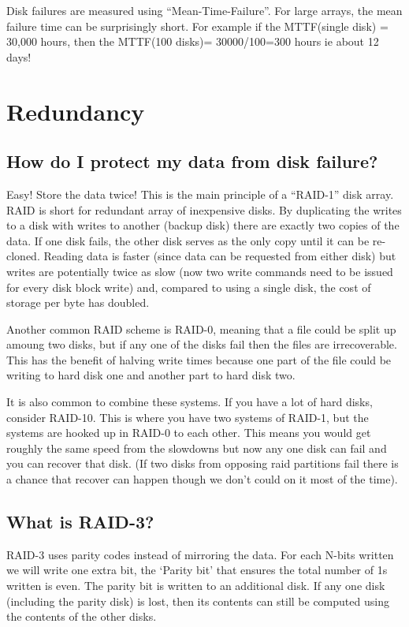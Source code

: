 Disk failures are measured using ``Mean-Time-Failure''. For large arrays, the mean failure time can be surprisingly short. For example if the MTTF(single disk) = 30,000 hours, then the MTTF(100 disks)= 30000/100=300 hours ie about 12 days!

\section{Redundancy}\label{redundancy}

\subsection{How do I protect my data from disk failure?}\label{how-do-i-protect-my-data-from-disk-failure}

Easy! Store the data twice! This is the main principle of a ``RAID-1'' disk array. RAID is short for redundant array of inexpensive disks. By duplicating the writes to a disk with writes to another (backup disk) there are exactly two copies of the data. If one disk fails, the other disk serves as the only copy until it can be re-cloned. Reading data is faster (since data can be requested from either disk) but writes are potentially twice as slow (now two write commands need to be issued for every disk block write) and, compared to using a single disk, the cost of storage per byte has doubled.

Another common RAID scheme is RAID-0, meaning that a file could be split up amoung two disks, but if any one of the disks fail then the files are irrecoverable. This has the benefit of halving write times because one part of the file could be writing to hard disk one and another part to hard disk two.

It is also common to combine these systems. If you have a lot of hard disks, consider RAID-10. This is where you have two systems of RAID-1, but the systems are hooked up in RAID-0 to each other. This means you would get roughly the same speed from the slowdowns but now any one disk can fail and you can recover that disk. (If two disks from opposing raid partitions fail there is a chance that recover can happen though we don't could on it most of the time).

\subsection{What is RAID-3?}\label{what-is-raid-3}

RAID-3 uses parity codes instead of mirroring the data. For each N-bits written we will write one extra bit, the `Parity bit' that ensures the total number of 1s written is even. The parity bit is written to an additional disk. If any one disk (including the parity disk) is lost, then its contents can still be computed using the contents of the other disks.


